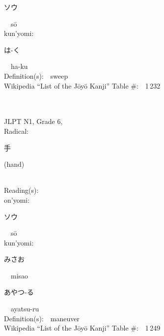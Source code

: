 \begin{multicols}{2}
{\hspace*{2em}}{\begin{CJK}{UTF8}{min} ソウ \end{CJK}}\ \ s\=o\ \ \\
{\hspace*{1em}}kun'yomi:\ \ \\
{\hspace*{2em}}{\begin{CJK}{UTF8}{min} は-く \end{CJK}}\ \ ha-ku\ \ \\
Definition(s):\ \ sweep \\
Wikipedia ``List of the J\=oy\=o Kanji'' Table \#:\ \ 1\,232 \\
\ \ \\
{\fontsize{34pt}{40pt}  }\ \ \\  %
{JLPT N1, Grade 6, \\Radical:\ \ {\begin{CJK}{UTF8}{min} 手 \end{CJK}} (hand) } \\
Reading(s):\ \ \\
{\hspace*{1em}}on'yomi:\ \ \\
{\hspace*{2em}}{\begin{CJK}{UTF8}{min} ソウ \end{CJK}}\ \ s\=o\ \ \\
{\hspace*{1em}}kun'yomi:\ \ \\
{\hspace*{2em}}{\begin{CJK}{UTF8}{min} みさお \end{CJK}}\ \ misao\ \ \\
{\hspace*{2em}}{\begin{CJK}{UTF8}{min} あやつ-る \end{CJK}}\ \ ayatsu-ru\ \ \\
Definition(s):\ \ maneuver \\
Wikipedia ``List of the J\=oy\=o Kanji'' Table \#:\ \ 1\,249 \\
\ \ \\
{\fontsize{34pt}{40pt}  }\ \ \\  %

\end{multicols}

